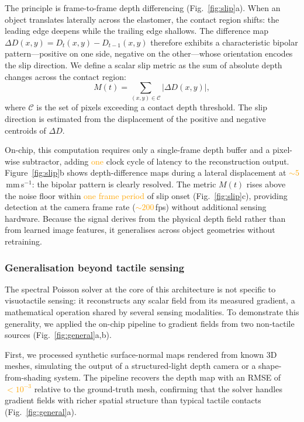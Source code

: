 \documentclass[10pt,a4paper]{article}
\newcommand{\placeholder}[1]{\textcolor{orange}{#1}}
\begin{document}
The principle is frame-to-frame depth differencing (Fig.~\ref{fig:slip}a). When an object translates laterally across the elastomer, the contact region shifts: the leading edge deepens while the trailing edge shallows. The difference map $\Delta D(x,y) = D_t(x,y) - D_{t-1}(x,y)$ therefore exhibits a characteristic bipolar pattern---positive on one side, negative on the other---whose orientation encodes the slip direction. We define a scalar slip metric as the sum of absolute depth changes across the contact region:
\begin{equation}
  M(t) = \sum_{(x,y) \in \mathcal{C}} |\Delta D(x,y)|,
\end{equation}
where $\mathcal{C}$ is the set of pixels exceeding a contact depth threshold. The slip direction is estimated from the displacement of the positive and negative centroids of $\Delta D$.

On-chip, this computation requires only a single-frame depth buffer and a pixel-wise subtractor, adding \placeholder{one} clock cycle of latency to the reconstruction output. Figure~\ref{fig:slip}b shows depth-difference maps during a lateral displacement at \placeholder{${\sim}5$}\,mm\,s$^{-1}$: the bipolar pattern is clearly resolved. The metric $M(t)$ rises above the noise floor within \placeholder{one frame period} of slip onset (Fig.~\ref{fig:slip}c), providing detection at the camera frame rate (\placeholder{${\sim}200$}\,fps) without additional sensing hardware. Because the signal derives from the physical depth field rather than from learned image features, it generalises across object geometries without retraining.

\subsubsection*{Generalisation beyond tactile sensing}

The spectral Poisson solver at the core of this architecture is not specific to visuotactile sensing: it reconstructs any scalar field from its measured gradient, a mathematical operation shared by several sensing modalities. To demonstrate this generality, we applied the on-chip pipeline to gradient fields from two non-tactile sources (Fig.~\ref{fig:general}a,b).

First, we processed synthetic surface-normal maps rendered from known 3D meshes, simulating the output of a structured-light depth camera or a shape-from-shading system. The pipeline recovers the depth map with an RMSE of \placeholder{$< 10^{-3}$} relative to the ground-truth mesh, confirming that the solver handles gradient fields with richer spatial structure than typical tactile contacts (Fig.~\ref{fig:general}a).
\end{document}
